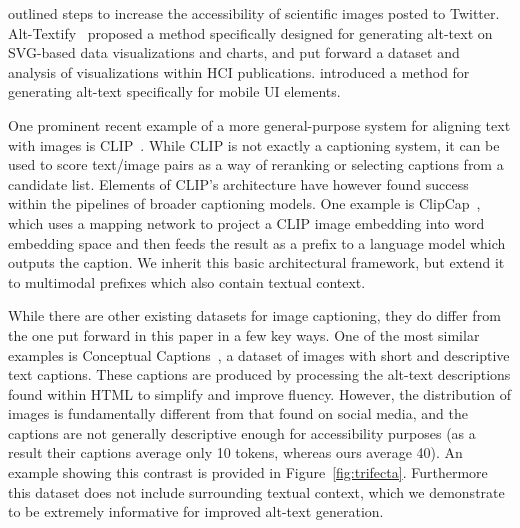 \documentclass{article} %
\begin{document}
\citet{sciencetwitter} outlined steps to increase the accessibility of scientific images posted to Twitter.
Alt-Textify~\citep{alttextify} proposed a method specifically designed for generating alt-text on SVG-based data visualizations and charts, and \citet{hci} put forward a dataset and analysis of visualizations within HCI publications.
\citet{widget} introduced a method for generating alt-text specifically for mobile UI elements.

One prominent recent example of a more general-purpose system for aligning text with images is CLIP~\citep{clip}.
While CLIP is not exactly a captioning system, it can be used to score text/image pairs as a way of reranking or selecting captions from a candidate list.
Elements of CLIP's architecture have however found success within the pipelines of broader captioning models.
One example is ClipCap~\citep{clipcap}, which uses a mapping network to project a CLIP image embedding into word embedding space and then feeds the result as a prefix to a language model which outputs the caption.
We inherit this basic architectural framework, but extend it to multimodal prefixes which also contain textual context.

While there are other existing datasets for image captioning, they do differ from the one put forward in this paper in a few key ways.
One of the most similar examples is Conceptual Captions~\citep{conceptual}, a dataset of images with short and descriptive text captions.
These captions are produced by processing the alt-text descriptions found within HTML to simplify and improve fluency.
However, the distribution of images is fundamentally different from that found on social media, and the captions are not generally descriptive enough for accessibility purposes (as a result their captions average only 10 tokens, whereas ours average 40).
An example showing this contrast is provided in Figure~\ref{fig:trifecta}.
Furthermore this dataset does not include surrounding textual context, which we demonstrate to be extremely informative for improved alt-text generation.
\end{document}
